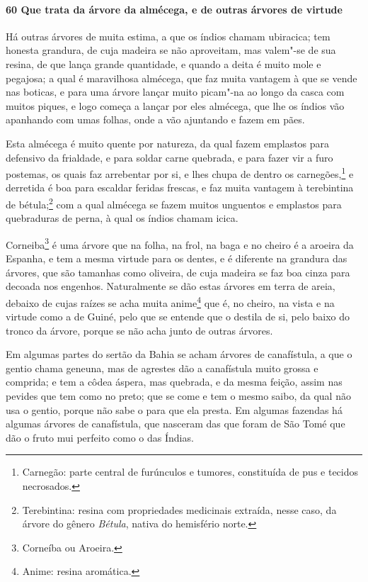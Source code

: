 \paragraph{60 Que trata da árvore da almécega, e de outras árvores de virtude}

Há outras árvores de muita estima, a que os índios chamam ubiracica; tem honesta grandura,
de cuja madeira se não aproveitam, mas valem"-se de sua resina, de que lança grande
quantidade, e quando a deita é muito mole e pegajosa; a qual é maravilhosa almécega, que
faz muita vantagem à que se vende nas boticas, e para uma árvore lançar muito picam"-na ao
longo da casca com muitos piques, e logo começa a lançar por eles almécega, que lhe os
índios vão apanhando com umas folhas, onde a vão ajuntando e fazem em pães.

Esta almécega é muito quente por natureza, da qual fazem emplastos para defensivo da
frialdade, e para soldar carne quebrada, e para fazer vir a furo postemas, os quais faz
arrebentar por si, e lhes chupa de dentro os carnegões,\footnote{ Carnegão: parte central
de furúnculos e tumores, constituída de pus e tecidos necrosados.} e derretida é boa para
escaldar feridas frescas, e faz muita vantagem à terebintina de bétula;\footnote{
Terebintina: resina com propriedades medicinais extraída, nesse caso, da árvore do gênero
\textit{Bétula}, nativa do hemisfério norte.} com a qual almécega se fazem muitos
unguentos e emplastos para quebraduras de perna, à qual os índios chamam icica.

Corneiba\footnote{ Corneíba ou Aroeira.} é uma árvore que na folha, na frol, na baga e no
cheiro é a aroeira da Espanha, e tem a mesma virtude para os dentes, e é diferente na
grandura das árvores, que são tamanhas como oliveira, de cuja madeira se faz boa cinza
para decoada nos engenhos. Naturalmente se dão estas árvores em terra de areia, debaixo de
cujas raízes se acha muita anime\footnote{ Anime: resina aromática.} que é, no cheiro, na
vista e na virtude como a de Guiné, pelo que se entende que o destila de si, pelo baixo do
tronco da árvore, porque se não acha junto de outras árvores.

Em algumas partes do sertão da Bahia se acham árvores de canafístula, a que o gentio chama
geneuna, mas de agrestes dão a canafístula muito grossa e comprida; e tem a côdea áspera,
mas quebrada, e da mesma feição, assim nas pevides que tem como no preto; que se come e
tem o mesmo saibo, da qual não usa o gentio, porque não sabe o para que ela presta. Em
algumas fazendas há algumas árvores de canafístula, que nasceram das que foram de São Tomé
que dão o fruto mui perfeito como o das Índias.

